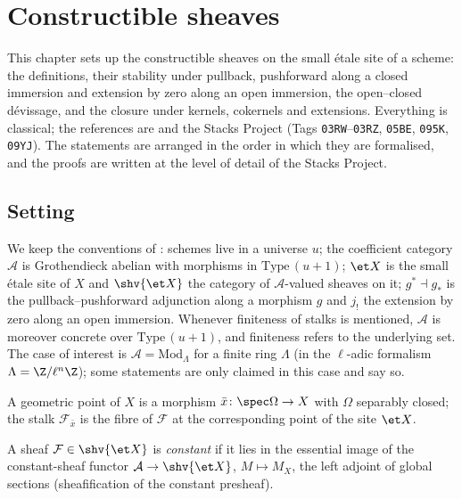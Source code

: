 
\chapter{Constructible sheaves}\label{chap:constructible}

This chapter sets up the constructible sheaves on the small \'etale site of
a scheme: the definitions, their stability under pullback, pushforward along
a closed immersion and extension by zero along an open immersion, the
open--closed d\'evissage, and the closure under kernels, cokernels and
extensions.  Everything is classical; the references are
\cite[Exp.~IX, \S2]{SGA4} and the Stacks Project (Tags \texttt{03RW}--\texttt{03RZ},
\texttt{05BE}, \texttt{095K}, \texttt{09YJ}).  The statements are arranged
in the order in which they are formalised, and the proofs are written at
the level of detail of the Stacks Project.

\section{Setting}\label{sec:constructible-setting}

We keep the conventions of : schemes live in a
universe $u$; the coefficient category $\mathcal A$ is Grothendieck abelian
with morphisms in $\mathrm{Type}\,(u+1)$; $\et X$ is the small \'etale site
of $X$ and $\shv{\et X}$ the category of $\mathcal A$-valued sheaves on it;
$g^*\dashv g_*$ is the pullback--pushforward adjunction along a morphism $g$
and $j_!$ the extension by zero along an open immersion.  Whenever
finiteness of stalks is mentioned, $\mathcal A$ is moreover concrete over
$\mathrm{Type}\,(u+1)$, and finiteness refers to the underlying set.  The
case of interest is $\mathcal A=\mathrm{Mod}_\Lambda$ for a finite ring
$\Lambda$ (in the $\ell$-adic formalism $\Lambda=\Z/\ell^n\Z$); some
statements are only claimed in this case and say so.

A geometric point of $X$ is a morphism $\bar x\colon\spec\Omega\to X$ with
$\Omega$ separably closed; the stalk $\mathcal F_{\bar x}$ is the fibre of
$\mathcal F$ at the corresponding point of the site $\et X$.

\begin{definition}\label{def:constructible-constant}
\leanok
A sheaf $\mathcal F\in\shv{\et X}$ is \emph{constant} if it lies in the
essential image of the constant-sheaf functor
$\mathcal A\to\shv{\et X}$, $M\mapsto M_X$, the left adjoint of global
sections (sheafification of the constant presheaf).
\end{definition}

